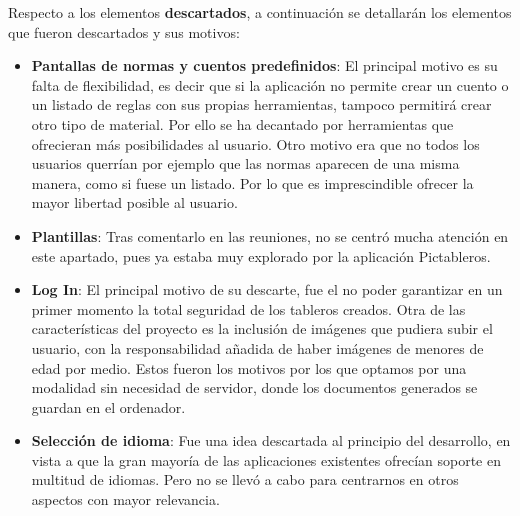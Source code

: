 Respecto a los elementos \textbf{descartados}, a continuación se detallarán los elementos que fueron descartados y sus motivos:

\begin{itemize}
	\item\textbf{Pantallas de normas y cuentos predefinidos}: El principal motivo es su falta de flexibilidad, es decir que si la aplicación no permite crear un cuento o un listado de reglas con sus propias herramientas, tampoco permitirá crear otro tipo de material. Por ello se ha decantado por herramientas que ofrecieran más posibilidades al usuario. Otro motivo era que no todos los usuarios querrían por ejemplo que las normas aparecen de una misma manera, como si fuese un listado. Por lo que es imprescindible ofrecer la mayor libertad posible al usuario.
	
	\item \textbf{Plantillas}: Tras comentarlo en las reuniones, no se centró mucha atención en este apartado, pues ya estaba muy explorado por la aplicación Pictableros.
	
	\item \textbf{Log In}: El principal motivo de su descarte, fue el no poder garantizar en un primer momento la total seguridad de los tableros creados.
	Otra de las características del proyecto es la inclusión de imágenes que pudiera subir el usuario, con la responsabilidad añadida de haber imágenes de menores de edad por medio. Estos fueron los motivos por los que optamos por una modalidad sin necesidad de servidor, donde los documentos generados se guardan en el ordenador.
	
	\item \textbf{Selección de idioma}: Fue una idea descartada al principio del desarrollo, en vista a que la gran mayoría de las aplicaciones existentes ofrecían soporte en multitud de idiomas. Pero no se llevó a cabo para centrarnos en otros aspectos con mayor relevancia.
	
\end{itemize}






